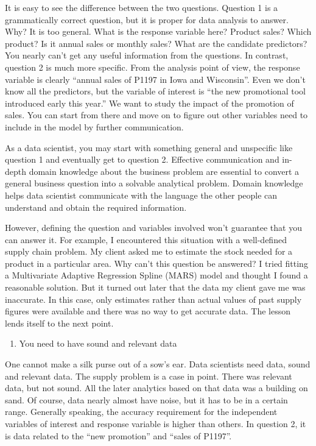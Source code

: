 \documentclass[12pt,]{krantz}
\providecommand{\tightlist}{%
  \setlength{\itemsep}{0pt}\setlength{\parskip}{0pt}}
\theoremstyle{definition}
\theoremstyle{definition}
\theoremstyle{definition}
\theoremstyle{remark}
\begin{document}
It is easy to see the difference between the two questions. Question 1
is a grammatically correct question, but it is proper for data analysis
to answer. Why? It is too general. What is the response variable here?
Product sales? Which product? Is it annual sales or monthly sales? What
are the candidate predictors? You nearly can't get any useful
information from the questions. In contrast, question 2 is much more
specific. From the analysis point of view, the response variable is
clearly ``annual sales of P1197 in Iowa and Wisconsin''. Even we don't
know all the predictors, but the variable of interest is ``the new
promotional tool introduced early this year.'' We want to study the
impact of the promotion of sales. You can start from there and move on
to figure out other variables need to include in the model by further
communication.

As a data scientist, you may start with something general and unspecific
like question 1 and eventually get to question 2. Effective
communication and in-depth domain knowledge about the business problem
are essential to convert a general business question into a solvable
analytical problem. Domain knowledge helps data scientist communicate
with the language the other people can understand and obtain the
required information.

However, defining the question and variables involved won't guarantee
that you can answer it. For example, I encountered this situation with a
well-defined supply chain problem. My client asked me to estimate the
stock needed for a product in a particular area. Why can't this question
be answered? I tried fitting a Multivariate Adaptive Regression Spline
(MARS) model and thought I found a reasonable solution. But it turned
out later that the data my client gave me was inaccurate. In this case,
only estimates rather than actual values of past supply figures were
available and there was no way to get accurate data. The lesson lends
itself to the next point.

\begin{enumerate}
\def\labelenumi{\arabic{enumi}.}
\setcounter{enumi}{1}
\tightlist
\item
  You need to have sound and relevant data
\end{enumerate}

One cannot make a silk purse out of a sow's ear. Data scientists need
data, sound and relevant data. The supply problem is a case in point.
There was relevant data, but not sound. All the later analytics based on
that data was a building on sand. Of course, data nearly almost have
noise, but it has to be in a certain range. Generally speaking, the
accuracy requirement for the independent variables of interest and
response variable is higher than others. In question 2, it is data
related to the ``new promotion'' and ``sales of P1197''.
\end{document}
